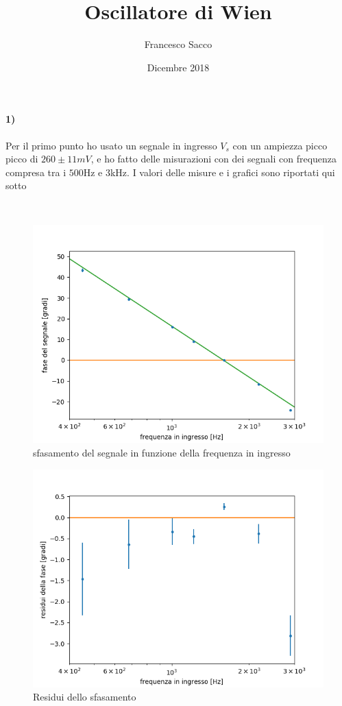 \documentclass{article}
\date{Dicembre 2018}
\author{Francesco Sacco}
\title{Oscillatore di Wien}
\begin{document}
\maketitle
\paragraph{1)}
	Per il primo punto ho usato un segnale in ingresso $V_s$ con un ampiezza picco picco di $260\pm11 mV$, e ho fatto delle misurazioni con dei segnali con frequenza compresa tra i $500$Hz e $3$kHz. I valori delle misure e i grafici sono riportati qui sotto\newline
	\begin{center}
		\\
	\end{center}
	\begin{figure}[h]
		\centering
		\includegraphics[width=\linewidth]{figure/1.png}
		\caption{sfasamento del segnale in funzione della frequenza in ingresso}
		\label{fig:1}
	\end{figure}
	\begin{figure}[h]
		\centering
		\includegraphics[width=\linewidth]{figure/1res.png}
		\caption{Residui dello sfasamento}
		\label{fig:1res}
	\end{figure}
\end{document}
